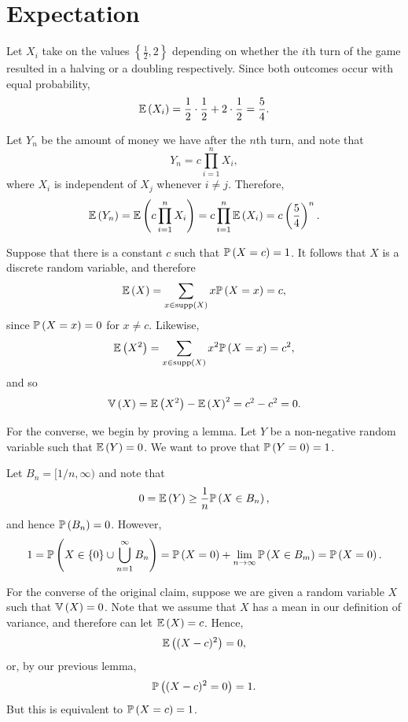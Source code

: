 \chapter{Expectation}

\begin{ex}
  Let $X_i$ take on the values $\left\{\frac{1}{2}, 2\right\}$ depending on
  whether the $i$th turn of the game resulted in a halving or a doubling
  respectively. Since both outcomes occur with equal probability,
  \[
    \E{X_i} = \frac{1}{2}\cdot \frac{1}{2} + 2\cdot \frac{1}{2}=\frac{5}{4}.
  \]

  Let $Y_n$ be the amount of money we have after the $n$th turn, and note that
  \[
    Y_n = c\prod_{i=1}^nX_i,
  \]
  where $X_i$ is independent of $X_j$ whenever $i\neq j$. Therefore,
  \begin{align*}
    \E{Y_n}
    =\E{c\prod_{i=1}^nX_i}
    =c\prod_{i=1}^n\E{X_i}
    =c\left(\frac{5}{4} \right)^{n}.
  \end{align*}
\end{ex}

\begin{ex}
  Suppose that there is a constant $c$ such that $\P{X=c}=1$. It follows that
  $X$ is a discrete random variable, and therefore
  \[
    \E{X}=\sum_{x\in \supp(X)} x\P{X=x}=c,
  \]
  since $\P{X=x}=0$ for $x\neq c$. Likewise,
  \[
    \E{X^2}=\sum_{x\in \supp(X)} x^2\P{X=x}=c^2,
  \]
  and so
  \[
    \var{X}=\E{X^2}-\E{X}^2=c^2-c^2=0.
  \]

  For the converse, we begin by proving a lemma. Let $Y$ be a non-negative
  random variable such that $\E{Y}=0$. We want to prove that $\P{Y=0}=1$.

  Let $B_n=[1/n,\infty)$ and note that
  \[
    0=\E{Y}\geq \frac{1}{n}\P{X\in B_n},
  \]
  and hence $\P{B_n}=0$. However,
  \[
    1 = \P{X\in \{0\}\cup\bigcup_{n=1}^\infty B_n}=\P{X=0}+\lim_{n\to\infty}
    \P{X\in B_m}= \P{X=0}.
  \]

  For the converse of the original claim, suppose we are given a random variable
  $X$ such that $\var{X}=0$. Note that we assume that $X$ has a mean in our
  definition of variance, and therefore can let $\E{X}=c$. Hence,
  \[
    \E{(X-c)^2}=0,
  \]
  or, by our previous lemma,
  \[
    \P{(X-c)^2= 0}=1.
  \]
  But this is equivalent to $\P{X=c}=1$.
\end{ex}

